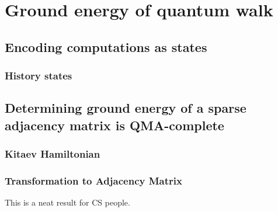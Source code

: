 % 

\chapter{Ground energy of quantum walk}

\section{Encoding computations as states}

\subsection{History states}

\section{Determining ground energy of a sparse adjacency matrix is QMA-complete}

\subsection{Kitaev Hamiltonian}

\subsection{Transformation to Adjacency Matrix}

This is a neat result for CS people.